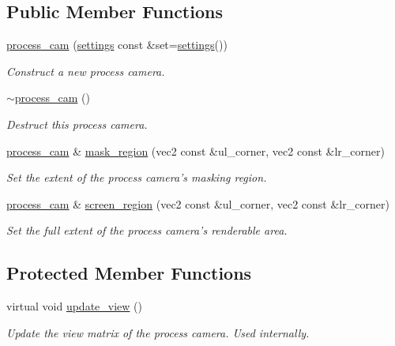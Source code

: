 \subsection*{Public Member Functions}
\begin{DoxyCompactItemize}
\item 
\hyperlink{classgfx_1_1process__cam_ae8140987d24060b32d38af0c974db57d}{process\-\_\-cam} (\hyperlink{classgfx_1_1process__cam_1_1settings}{settings} const \&set=\hyperlink{classgfx_1_1process__cam_1_1settings}{settings}())
\begin{DoxyCompactList}\small\item\em Construct a new process camera. \end{DoxyCompactList}\item 
\hypertarget{classgfx_1_1process__cam_ae37352650ea0f73fc5e896c0d2ac93b9}{\hyperlink{classgfx_1_1process__cam_ae37352650ea0f73fc5e896c0d2ac93b9}{$\sim$process\-\_\-cam} ()}\label{classgfx_1_1process__cam_ae37352650ea0f73fc5e896c0d2ac93b9}

\begin{DoxyCompactList}\small\item\em Destruct this process camera. \end{DoxyCompactList}\item 
\hyperlink{classgfx_1_1process__cam}{process\-\_\-cam} \& \hyperlink{classgfx_1_1process__cam_ab2f973b728a87300d284bc2a84b99d9f}{mask\-\_\-region} (vec2 const \&ul\-\_\-corner, vec2 const \&lr\-\_\-corner)
\begin{DoxyCompactList}\small\item\em Set the extent of the process camera's masking region. \end{DoxyCompactList}\item 
\hyperlink{classgfx_1_1process__cam}{process\-\_\-cam} \& \hyperlink{classgfx_1_1process__cam_a606398d6801ce89cedcf2db7762dd6a7}{screen\-\_\-region} (vec2 const \&ul\-\_\-corner, vec2 const \&lr\-\_\-corner)
\begin{DoxyCompactList}\small\item\em Set the full extent of the process camera's renderable area. \end{DoxyCompactList}\end{DoxyCompactItemize}
\subsection*{Protected Member Functions}
\begin{DoxyCompactItemize}
\item 
virtual void \hyperlink{classgfx_1_1process__cam_abf4a9226e8d0907b70f3eadc2b4229a5}{update\-\_\-view} ()
\begin{DoxyCompactList}\small\item\em Update the view matrix of the process camera. Used internally. \end{DoxyCompactList}\end{DoxyCompactItemize}
